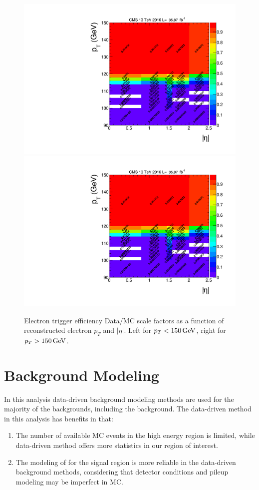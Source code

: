 \begin{figure}[htpb]
\begin{center}
\includegraphics[width=0.49\linewidth, page=5]{figures/hlt115electron_2016fulleff_absetapt.pdf}
\includegraphics[width=0.49\linewidth, page=6]{figures/hlt115electron_2016fulleff_absetapt.pdf}
\caption{Electron trigger efficiency Data/MC scale factors as a function of reconstructed electron $p_T$ and $|\eta|$. Left for $p_T <150\,\text{Ge\hspace{-.08em}V}$, right for $p_T >150\,\text{Ge\hspace{-.08em}V}$. }
\label{fig:trgeff_el_sf}
\end{center}
\end{figure}

\clearpage
\section{\boldmath{\Zjets} Background Modeling}\label{sec:dybk}
In this analysis data-driven background modeling methods are used for the majority of the backgrounds, including the \Zjets background. The data-driven method in this analysis has benefits in that:
\begin{enumerate}
\item The number of available MC events in the high energy region is limited, while data-driven method offers more statistics in our region of interest.
\item The modeling of \ptmiss for the signal region is more reliable in the data-driven background methods, considering that detector conditions and pileup modeling may be imperfect in MC.
\end{enumerate}

